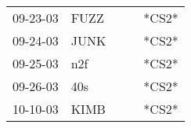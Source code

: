 \begin{supertabular}{p{0.07\textwidth}p{0.06\textwidth}p{0.02\textwidth}p{0.02\textwidth}p{0.06\textwidth}}
 09-23-03\textsuperscript{} &  FUZZ\textsuperscript{} &   &   &  *CS2* \\
 09-24-03\textsuperscript{} &  JUNK\textsuperscript{} &   &   &  *CS2* \\
 09-25-03\textsuperscript{} &   n2f\textsuperscript{} &   &   &  *CS2* \\
 09-26-03\textsuperscript{} &   40s\textsuperscript{} &   &   &  *CS2* \\
 10-10-03\textsuperscript{} &  KIMB\textsuperscript{} &   &   &  *CS2* \\
\end{supertabular}
